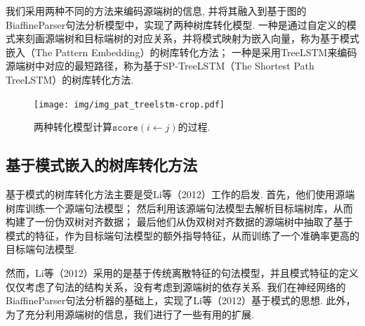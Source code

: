 我们采用两种不同的方法来编码源端树的信息, 并将其融入到基于图的BiaffineParser句法分析模型中，实现了两种树库转化模型.
一种是通过自定义的模式来刻画源端树和目标端树的对应关系，并将模式映射为嵌入向量，称为基于模式嵌入（The Pattern Embedding）的树库转化方法；
一种是采用TreeLSTM来编码源端树中对应的最短路径，称为基于SP-TreeLSTM（The Shortest Path TreeLSTM）的树库转化方法.
\begin{figure}[tb!]

    \centering
    \texttt{[image: img/img\_pat\_treelstm-crop.pdf]}
    \caption{两种转化模型计算$\texttt{score}(i \leftarrow j)$的过程. }
    \label{fig:conversion_models}
\end{figure}

\subsection{基于模式嵌入的树库转化方法}
基于模式的树库转化方法主要是受Li等（2012）\cite{li2012exploiting}工作的启发. 首先，他们使用源端树库训练一个源端句法模型；
然后利用该源端句法模型去解析目标端树库，从而构建了一份伪双树对齐数据；
最后他们从伪双树对齐数据的源端树中抽取了基于模式的特征，作为目标端句法模型的额外指导特征，从而训练了一个准确率更高的目标端句法模型.

然而，Li等（2012）\cite{li2012exploiting}采用的是基于传统离散特征的句法模型，并且模式特征的定义仅仅考虑了句法的结构关系，没有考虑到源端树的依存关系.
我们在神经网络的BiaffineParser句法分析器的基础上，实现了Li等（2012）\cite{li2012exploiting}基于模式的思想. 此外，为了充分利用源端树的信息，我们进行了一些有用的扩展.

